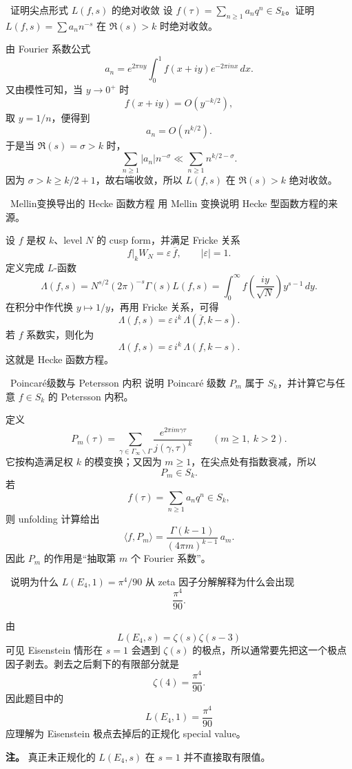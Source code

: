 \begin{problem}{\medium\ 证明尖点形式 $L(f,s)$ 的绝对收敛}
设 $f(\tau)=\sum_{n\ge1}a_nq^n\in S_k$。证明 $L(f,s)=\sum a_nn^{-s}$ 在 $\Re(s)>k$ 时绝对收敛。
\end{problem}
\begin{solution}
由 Fourier 系数公式
\[
a_n=e^{2\pi ny}\int_0^1 f(x+iy)e^{-2\pi inx}\,dx.
\]
又由模性可知，当 $y\to0^+$ 时
\[
f(x+iy)=O(y^{-k/2}),
\]
取 $y=1/n$，便得到
\[
a_n=O(n^{k/2}).
\]
于是当 $\Re(s)=\sigma>k$ 时，
\[
\sum_{n\ge1}|a_n|n^{-\sigma}
\ll
\sum_{n\ge1}n^{k/2-\sigma}.
\]
因为 $\sigma>k\ge k/2+1$，故右端收敛，所以 $L(f,s)$ 在 $\Re(s)>k$ 绝对收敛。
\end{solution}

\begin{problem}{\medium\ Mellin变换导出的 Hecke 函数方程}
用 Mellin 变换说明 Hecke 型函数方程的来源。
\end{problem}
\begin{solution}
设 $f$ 是权 $k$、level $N$ 的 cusp form，并满足 Fricke 关系
\[
f\big|_k W_N=\varepsilon\,\overline{f},\qquad |\varepsilon|=1.
\]
定义完成 $L$-函数
\[
\Lambda(f,s)=N^{s/2}(2\pi)^{-s}\Gamma(s)L(f,s)
=\int_0^\infty f\!\left(\frac{iy}{\sqrt N}\right)y^{s-1}\,dy.
\]
在积分中作代换 $y\mapsto 1/y$，再用 Fricke 关系，可得
\[
\Lambda(f,s)=\varepsilon\, i^k\,\Lambda(\overline f,k-s).
\]
若 $f$ 系数实，则化为
\[
\Lambda(f,s)=\varepsilon\, i^k\,\Lambda(f,k-s).
\]
这就是 Hecke 函数方程。
\end{solution}

\begin{problem}{\medium\ Poincar\'e级数与 Petersson 内积}
说明 Poincar\'e 级数 $P_m$ 属于 $S_k$，并计算它与任意 $f\in S_k$ 的 Petersson 内积。
\end{problem}
\begin{solution}
定义
\[
P_m(\tau)=\sum_{\gamma\in \Gamma_\infty\backslash \Gamma}
\frac{e^{2\pi i m\gamma\tau}}{j(\gamma,\tau)^k}
\qquad (m\ge1,\ k>2).
\]
它按构造满足权 $k$ 的模变换；又因为 $m\ge1$，在尖点处有指数衰减，所以
\[
P_m\in S_k.
\]
若
\[
f(\tau)=\sum_{n\ge1}a_nq^n\in S_k,
\]
则 unfolding 计算给出
\[
\langle f,P_m\rangle
=
\frac{\Gamma(k-1)}{(4\pi m)^{k-1}}\,a_m.
\]
因此 $P_m$ 的作用是“抽取第 $m$ 个 Fourier 系数”。
\end{solution}

\begin{problem}{\medium\ 说明为什么 $L(E_4,1)=\pi^4/90$}
从 zeta 因子分解解释为什么会出现
\[
\frac{\pi^4}{90}.
\]
\end{problem}
\begin{solution}
由
\[
L(E_4,s)=\zeta(s)\zeta(s-3)
\]
可见 Eisenstein 情形在 $s=1$ 会遇到 $\zeta(s)$ 的极点，所以通常要先把这一个极点因子剥去。剥去之后剩下的有限部分就是
\[
\zeta(4)=\frac{\pi^4}{90}.
\]
因此题目中的
\[
L(E_4,1)=\frac{\pi^4}{90}
\]
应理解为 Eisenstein 极点去掉后的正规化 special value。

\textbf{注。} 真正未正规化的 $L(E_4,s)$ 在 $s=1$ 并不直接取有限值。
\end{solution}

